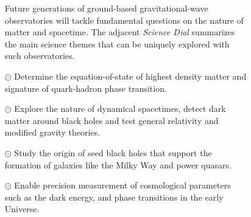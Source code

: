 \documentclass[twocolumn,aps,prd,nofootinbib,superscriptaddress,10pt,notitlepage,preprintnumbers] {revtex4-1}
\begin{document}
\begin{figure}
 \begin{tcolorbox}[standard jigsaw,colframe=gray, colback=black!10!cyan, opacityback=0.1, coltext=black, title=\sc Box 1: Science Goals for Next Generation Ground-Based Detectors]

\begin{minipage}{0.45\textwidth}
\end{minipage}
\hfill
\begin{minipage}{0.50\textwidth}
\begin{itemize}
\item[] Future generations of ground-based gravitational-wave observatories will tackle fundamental questions on the nature of matter and spacetime. The adjacent \emph{Science Dial} summarizes the main science themes that can be uniquely explored with such observatories.
\item[$\odot$] Determine the equation-of-state of highest density matter and signature of quark-hadron phase transition.
\item [$\odot$]Explore the nature of dynamical spacetimes, detect dark matter around black holes and test general relativity and modified gravity theories. 
\item [$\odot$]Study the origin of seed black holes that support the formation of galaxies like the Milky Way and power quasars.
\item [$\odot$] Enable precision measurement of cosmological parameters such as the dark energy, and phase transitions in the early Universe. 
\end{itemize}
\end{minipage}
\end{tcolorbox}
\end{figure}
\end{document}
